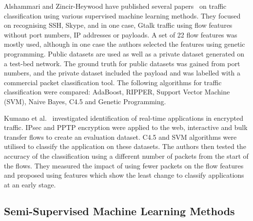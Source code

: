 Alshammari and Zincir-Heywood have published several papers~\cite{Alshammari-2009-Classifying, Alshammari-2007-flow, Alshammari-2009-Preliminary, Alshammari-2009-Machine, Alshammari-2010-Investigation, Alshammari-2011-Can} on traffic classification using various supervised machine learning methods. They focused on recognising SSH, Skype, and in one case, Gtalk traffic using flow features without port numbers, IP addresses or payloads. A set of 22 flow features was mostly used, although in one case the authors selected the features using genetic programming. Public datasets are used as well as a private dataset generated on a test-bed network. The ground truth for public datasets was gained from port numbers, and the private dataset included the payload and was labelled with a commercial packet classification tool. The following algorithms for traffic classification were compared: AdaBoost, RIPPER, Support Vector Machine (SVM), Naive Bayes, C4.5 and Genetic Programming.

Kumano et al.~\cite{Kumano-2014-Towards} investigated identification of real-time applications in encrypted traffic. IPsec and PPTP encryption were applied to the web, interactive and bulk transfer flows to create an evaluation dataset. C4.5 and SVM algorithms were utilised to classify the application on these datasets. The authors then tested the accuracy of the classification using a different number of packets from the start of the flows. They measured the impact of using fewer packets on the flow features and proposed using features which show the least change to classify applications at an early stage.


\subsection{Semi-Supervised Machine Learning Methods}\label{subsec:semisupervised}

